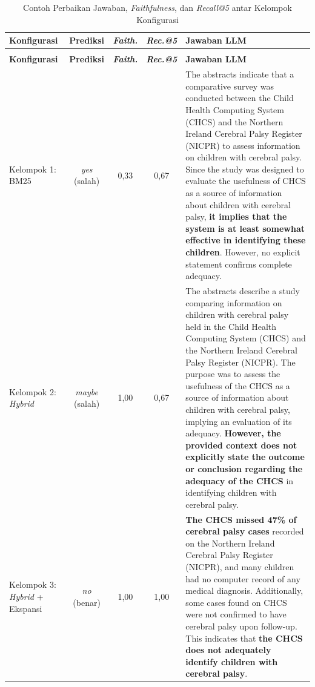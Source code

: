 {\footnotesize
\setlength{\tabcolsep}{4pt}
\begin{longtable}{@{}>{\raggedright\arraybackslash}p{2.1cm} c c c >{\raggedright\arraybackslash}p{6.6cm}@{}}
\caption{Contoh Perbaikan Jawaban, \textit{Faithfulness}, dan \textit{Recall@5} antar Kelompok Konfigurasi}
\label{tbl:contoh-faithfulness} \\
\toprule
\textbf{Konfigurasi} & \textbf{Prediksi} & \textbf{\textit{Faith.}} & \textbf{\textit{Rec.@5}} & \textbf{Jawaban LLM} \\
\midrule
\endfirsthead
\multicolumn{5}{@{}l}{\textit{Lanjutan Tabel~\ref{tbl:contoh-faithfulness}.}} \\
\toprule
\textbf{Konfigurasi} & \textbf{Prediksi} & \textbf{\textit{Faith.}} & \textbf{\textit{Rec.@5}} & \textbf{Jawaban LLM} \\
\midrule
\endhead
Kelompok 1: BM25 & \textit{yes} (salah) & 0{,}33 & 0{,}67 & The abstracts indicate that a comparative survey was conducted between the Child Health Computing System (CHCS) and the Northern Ireland Cerebral Palsy Register (NICPR) to assess information on children with cerebral palsy. Since the study was designed to evaluate the usefulness of CHCS as a source of information about children with cerebral palsy, \textbf{it implies that the system is at least somewhat effective in identifying these children}. However, no explicit statement confirms complete adequacy. \\
\addlinespace
Kelompok 2: \textit{Hybrid} & \textit{maybe} (salah) & 1{,}00 & 0{,}67 & The abstracts describe a study comparing information on children with cerebral palsy held in the Child Health Computing System (CHCS) and the Northern Ireland Cerebral Palsy Register (NICPR). The purpose was to assess the usefulness of the CHCS as a source of information about children with cerebral palsy, implying an evaluation of its adequacy. \textbf{However, the provided context does not explicitly state the outcome or conclusion regarding the adequacy of the CHCS} in identifying children with cerebral palsy. \\
\addlinespace
Kelompok 3: \textit{Hybrid} + Ekspansi & \textit{no} (benar) & 1{,}00 & 1{,}00 & \textbf{The CHCS missed 47\% of cerebral palsy cases} recorded on the Northern Ireland Cerebral Palsy Register (NICPR), and many children had no computer record of any medical diagnosis. Additionally, some cases found on CHCS were not confirmed to have cerebral palsy upon follow-up. This indicates that \textbf{the CHCS does not adequately identify children with cerebral palsy}. \\
\bottomrule
\end{longtable}
}

